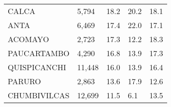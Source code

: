 \begin{tabular}{lllll}
	\cellcolor[HTML]{FF5050}CALCA                                  & 5,794                                                                 & 18.2                                                                             & 20.2                                                                        & 18.1                                                                                \\
	\cellcolor[HTML]{FF5050}ANTA                                   & 6,469                                                                 & 17.4                                                                             & 22.0                                                                        & 17.1                                                                                \\
	\cellcolor[HTML]{FF5050}ACOMAYO                                & 2,723                                                                 & 17.3                                                                             & 12.2                                                                        & 18.3                                                                                \\
	\cellcolor[HTML]{FF5050}PAUCARTAMBO                            & 4,290                                                                 & 16.8                                                                             & 13.9                                                                        & 17.3                                                                                \\
	\cellcolor[HTML]{FF5050}QUISPICANCHI                           & 11,448                                                                & 16.0                                                                             & 13.9                                                                        & 16.4                                                                                \\
	\cellcolor[HTML]{FF5050}PARURO                                 & 2,863                                                                 & 13.6                                                                             & 17.9                                                                        & 12.6                                                                                \\
	\cellcolor[HTML]{FF5050}CHUMBIVILCAS                           & 12,699                                                                & 11.5                                                                             & 6.1                                                                         & 13.5                                                                                \\

\end{tabular}
